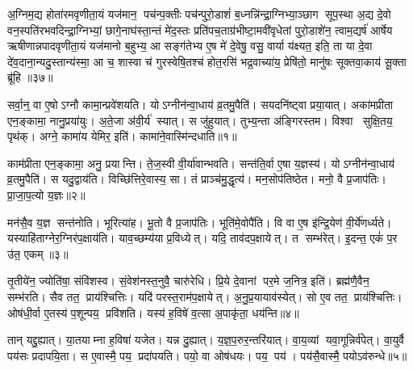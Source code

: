अ॒ग्निम॒द्य होता॑रमवृणीता॒यं यज॑मान॒ पच॑न्प॒क्तीः पच॑न्पुरो॒डाशं॑ ब॒ध्नन्नि॑न्द्रा॒ग्निभ्या॒ञ्छाग सूप॒स्था अ॒द्य दे॒वो वन॒स्पति॑रभवदिन्द्रा॒ग्निभ्यां॒ छागे॒नाघ॑स्ता॒न्तं मे॑द॒स्तः प्रति॑पच॒ताग्र॑भीष्टा॒मवी॑वृधेतां पुरो॒डाशे॑न॒ त्वाम॒द्यर्\mbox{}ष॑ आर्\mbox{}षेय ऋषीणान्नपादवृणीता॒यं यज॑मानो ब॒हुभ्य॒ आ सङ्ग॑तेभ्य ए॒ष मे॑ दे॒वेषु॒ वसु॒ वार्या य॑क्ष्यत॒ इति॒ ता या दे॒वा दे॑व॒दाना॒न्यदु॒स्तान्य॑स्मा॒ आ च॒ शास्वा च॑ गुरस्वेषि॒तश्च॑ होत॒रसि॑ भद्र॒वाच्या॑य॒ प्रेषि॑तो॒ मानु॑षः सूक्तवा॒काय॑ सू॒क्ता ब्रू॑हि ॥३७॥\anuvakamend[अ॒ग्निम॒द्यैकम्]






\clearpage
{}
\setcounter{anuvakam}{0}

सर्वा॒न्॒ वा ए॒षोऽग्नौ कामा॒न्प्रवे॑शयति।
योऽग्नीन॑न्वा॒धाय॑ व्र॒तमु॒पैति॑।
सयदनि॑ष्ट्वा प्रया॒यात्।
अका॑मप्रीता एन॒ङ्कामा॒ नानु॒प्रया॑युः।
अ॒ते॒जा अ॑वी॒र्य॑ स्यात्।
स जु॑हुयात्।
तुभ्य॒न्ता अ॑ङ्गिरस्तम।
विश्वा सुक्षि॒तय॒ पृथ॑क्।
अग्ने॒ कामा॑य येमिर॒ इति॑।
कामा॑ने॒वास्मि॑न्दधाति॥१॥

काम॑प्रीता एन॒ङ्कामा॒ अनु॒ प्रयान्ति।
ते॒ज॒स्वी वी॒र्या॑वान्भवति।
सन्त॑ति॒र्वा ए॒षा य॒ज्ञस्य॑।
योऽग्नीन॑न्वा॒धाय॑ व्र॒तमु॒पैति॑।
स यदु॒द्वाय॑ति।
विच्छि॑त्तिरे॒वास्य॒ सा।
तं प्राञ्च॑मु॒द्धृत्य॑।
मन॒सोप॑तिष्ठेत।
मनो॒ वै प्र॒जाप॑तिः।
प्रा॒जा॒प॒त्यो य॒ज्ञः॥२॥

मन॑सै॒व य॒ज्ञ सन्त॑नोति।
भूरित्या॑ह।
भू॒तो वै प्र॒जाप॑तिः।
भूति॑मे॒वोपै॑ति।
वि वा ए॒ष इ॑न्द्रि॒येण॑ वी॒र्ये॑णर्ध्यते।
यस्याहि॑ताग्नेर॒ग्निर॑प॒क्षाय॑ति।
याव॒च्छम्य॑या प्र॒विध्येत्।
यदि॒ ताव॑दप॒क्षायेत्।
त सम्भ॑रेत्।
इ॒दन्त॒ एकं॑ प॒र उ॑त॒ एकम्॥३॥

तृ॒तीये॑न॒ ज्योति॑षा॒ संवि॑शस्व।
सं॒वेश॑नस्त॒नुवै॒ चारु॑रेधि।
प्रि॒ये दे॒वानां पर॒मे ज॒नित्र॒ इति॑।
ब्रह्म॑णै॒वैन॒ सम्भ॑रति।
सैव तत॒ प्राय॑श्चित्तिः।
यदि॑ परस्त॒राम॑प॒क्षायेत्।
अ॒नु॒प्र॒यायाव॑स्येत्।
सो ए॒व तत॒ प्राय॑श्चित्तिः।
ओष॑धी॒र्वा ए॒तस्य॑ प॒शून्पय॒ प्रवि॑शति।
यस्य॑ ह॒विषे॑ व॒त्सा अ॒पाकृ॑ता॒ धय॑न्ति॥४॥

तान् यद्दु॒ह्यात्।
या॒तयाम्ना ह॒विषा॑ यजेत।
यन्न दु॒ह्यात्।
य॒ज्ञ॒प॒रुर॒न्तरि॑यात्।
वा॒य॒व्यां यवा॒गून्निर्व॑पेत्।
वा॒युर्वै पय॑सः प्रदापयि॒ता।
स ए॒वास्मै॒ पय॒ प्रदा॑पयति।
पयो॒ वा ओष॑धयः।
पय॒ पय॑।
पय॑सै॒वास्मै॒ पयोऽव॑रुन्धे॥५॥

